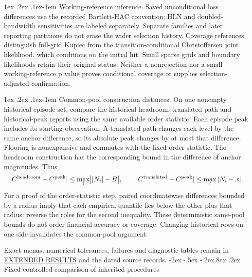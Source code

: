 \documentclass[10pt,a4paper]{article}
\makeatletter
\renewcommand\section{\@startsection{section}{1}{\z@}%
  {-2ex \@plus -.5ex \@minus -.2ex}{.8ex \@plus .2ex}%
  {\normalfont\large\bfseries}}
\renewcommand\paragraph{\@startsection{paragraph}{4}{\z@}%
  {1ex \@plus .2ex \@minus .1ex}{-1em}%
  {\normalfont\normalsize\bfseries}}
\makeatother
\begin{document}
\paragraph{Working-reference inference.}
Saved unconditional loss differences use the recorded Bartlett-HAC convention;
HLN and doubled-bandwidth sensitivities are labeled separately. Separate
families and later reporting partitions do not erase the wider selection
history. Coverage references distinguish full-grid Kupiec from the
transition-conditional Christoffersen joint likelihood, which conditions on
the initial hit. Small sparse grids and boundary likelihoods retain their
original status. Neither a nonrejection nor a small working-reference p value
proves conditional coverage or supplies selection-adjusted confirmation.

\paragraph{Common-pool construction distances.}
On one nonempty historical episode set, compare the historical headroom,
translated-path and historical-peak reports using the same available order
statistic. Each episode peak includes its starting observation. A translated
path changes each level by the same anchor difference, so its absolute peak
changes by at most that difference. Flooring is nonexpansive and commutes with
the fixed order statistic. The headroom construction has the corresponding
bound in the difference of anchor magnitudes. Thus
\[
|C^{\rm headroom}-C^{\rm peak}|\le\max_i\bigl||N_i|-B\bigr|,\qquad
|C^{\rm translated}-C^{\rm peak}|\le\max_i|N_i-x|.
\]
For a proof of the order-statistic step, paired coordinatewise differences
bounded by a radius imply that each empirical quantile lies below the other
plus that radius; reverse the roles for the second inequality. These
deterministic same-pool bounds do not order financial accuracy or coverage.
Changing historical rows on one side invalidates the common-pool argument.

Exact menus, numerical tolerances, failures and diagnostic tables remain in
\href{https://github.com/ByronLi0207/financial-mathematics-paper-20261020/blob/revision-v7-final/EXTENDED_RESULTS.md}{EXTENDED RESULTS} and the dated source records.
\section{Fixed controlled comparison of inherited procedures}\label{sup:v8-mc}
\end{document}

